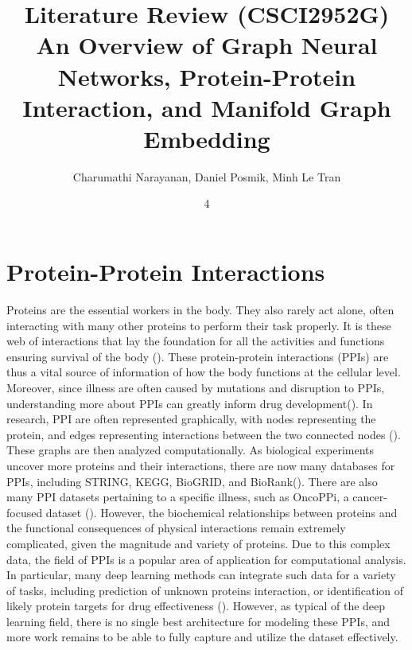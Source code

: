 \documentclass[twoside,11pt]{article}
\begin{document}
\title{	Literature Review (CSCI2952G) \\
\vspace{.1in}
An Overview of Graph Neural Networks, Protein-Protein Interaction, and Manifold Graph Embedding 	
}

\author{Charumathi Narayanan, Daniel Posmik, Minh Le Tran}

\maketitle
\date{4 }

\section{Protein-Protein Interactions} 
\label{sec:Intor}
Proteins are the essential workers in the body. They also rarely act alone, often interacting with many other proteins to perform their task properly. It is these web of interactions that lay the foundation for all the activities and functions ensuring survival of the body (\citet{PPI_hist}). These protein-protein interactions (PPIs) are thus a vital source of information of how the body functions at the cellular level. Moreover, since illness are often caused by mutations and disruption to PPIs, understanding more about PPIs can greatly inform drug development(\citet{PPI_disease}). In research, PPI are often represented graphically, with nodes representing the protein, and edges representing interactions between the two connected nodes (\citet{PPI_methods}). These graphs are then analyzed computationally. As biological experiments uncover more proteins and their interactions, there are now many databases for PPIs, including STRING, KEGG, BioGRID, and BioRank(\citet{PPI_methods}). There are also many PPI datasets pertaining to a specific illness, such as OncoPPi, a cancer-focused dataset (\citet{OncoPPi}). However, the biochemical relationships between proteins and the functional consequences of physical interactions remain extremely complicated, given the magnitude and variety of proteins. Due to this complex data, the field of PPIs is a popular area of application for computational analysis. In particular, many deep learning methods can integrate such data for a variety of tasks, including prediction of unknown proteins interaction, or identification of likely protein targets for drug effectiveness (\citet{PPI_DL}). However, as typical of the deep learning field, there is no single best architecture for modeling these PPIs, and more work remains to be able to fully capture and utilize the dataset effectively. 
\end{document}

